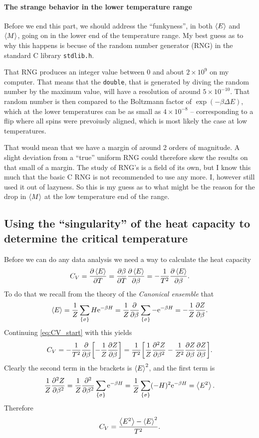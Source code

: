 \documentclass[11pt,letter, swedish, english
]{article}
\newcommand{\DE}{\ensuremath{\Delta{E}}}
\begin{document}
\paragraph{The strange behavior in the lower temperature range}
Before we end this part, we should address the ``funkyness'', in both
$\ev{E}$ and $\ev{M}$, going on in the lower end of the temperature
range. My best guess as to why this happens is becuse of the random
number generator (RNG) in the standard C library \texttt{stdlib.h}.

That RNG produces an integer value between 0 and about $2\times10^9$
on my computer. That means that the \texttt{double}, that is generated
by diving the random number by the maximum value, will have a
resolution of around $5\times10^{-10}$. 
That random number is then compared to the Boltzmann factor of
$\exp(-\beta\DE)$, which at the lower temperatures can be as small as
$4\times10^{-8}$ -- corresponding to a flip where all spins were
prevoiusly aligned, which is most likely the case at low temperatures.  

That would mean that we have a margin of around 2 orders of magnitude.
A slight deviation from a ``true'' uniform RNG could therefore skew the
results on that small of a margin. The study of RNG's is a field of
its own, but I know this much that the basic C RNG is not recommended
to use any more. I, however still used it out of lazyness. So this is
my guess as to what might be the reason for the drop in $\ev{M}$ at
the low temperature end of the range. 



\subsection{Using the ``singularity'' of the heat capacity to determine the critical temperature}
Before we can do any data analysis we need a way to calculate the heat
capacity
\begin{equation}\label{eq:CV_start}
C_V = \pdv{\ev{E}}{T} = \pdv{\beta}{T}\pdv{\ev{E}}{\beta} 
= -\frac{1}{T^2}\pdv{\ev{E}}{\beta}.
\end{equation}
To do that we recall from the theory of the 
\emph{Canonical ensemble} that 
\begin{equation}
\ev{E} = \frac{1}{Z}\sum_{\{\sigma\}} H\ee^{-\beta H}
= \frac{1}{Z} \pdv{\beta}\sum_{\{\sigma\}} -\ee^{-\beta H}
= -\frac{1}{Z} \pdv{Z}{\beta}.
\end{equation}
Continuing \eqref{eq:CV_start} with this yields
\begin{equation}
C_V = -\frac{1}{T^2}\pdv{\beta}
\qty[-\frac{1}{Z} \pdv{Z}{\beta}]
=\frac{1}{T^2}\qty[
\frac{1}{Z} \pdv[2]{Z}{\beta}
-\frac{1}{Z^2} \pdv{Z}{\beta}\pdv{Z}{\beta}].
\end{equation}
Clearly the second term in the brackets is $\ev{E}^2$, and the first
term is
\begin{equation}
\frac{1}{Z} \pdv[2]{Z}{\beta}
=\frac{1}{Z} \pdv[2]{\beta}\sum_{\{\sigma\}} \ee^{-\beta H}
=\frac{1}{Z} \sum_{\{\sigma\}} (-H)^2 \ee^{-\beta H}
= \ev{E^2}.
\end{equation}
Therefore
\begin{equation}
C_V = \frac{\ev{E^2}-\ev{E}^2}{T^2}.
\end{equation}
\end{document}
